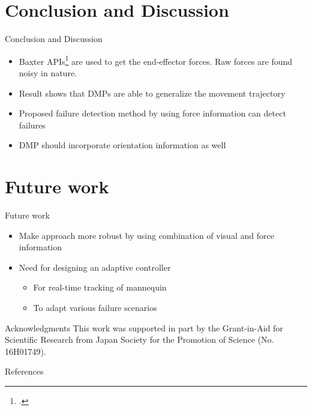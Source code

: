 \documentclass[aspectratio=43,11pt,xcolor={dvipsnames}]{beamer}
\begin{document}
\section{Conclusion and Discussion}
\begin{frame}{Conclusion and Discussion}
	\linespread{1.5}
	
	\begin{itemize}
		\item Baxter APIs\footcite{fitzgerald2013developing} are used to get the end-effector forces. Raw forces are found noisy in nature.
		\item Result shows that DMPs are able to generalize the movement trajectory
		\item Proposed failure detection method by using force information can detect failures
		\item DMP should incorporate orientation information as well
	\end{itemize}
\end{frame}

\section{Future work}
\begin{frame}{Future work}
	\linespread{1.5}
	
	\begin{itemize}
		\item Make approach more robust by using combination of visual and force information
		\item Need for designing an adaptive controller
		      \begin{itemize}
		      	\item For real-time tracking of mannequin
		      	\item To adapt various failure scenarios
		      \end{itemize}
	\end{itemize}
		
	\begin{exampleblock}{Acknowledgments}
		This work was supported in part by the Grant-in-Aid for Scientific Research from Japan Society for the Promotion of Science (No. 16H01749).
	\end{exampleblock}
\end{frame}

\begin{frame}[noframenumbering]{References}
	\nocite{*}
	\hspace*{0.5cm}
	\begin{minipage}{\dimexpr\textwidth-1cm\relax}
		\printbibliography
	\end{minipage}
\end{frame}



\end{document}
